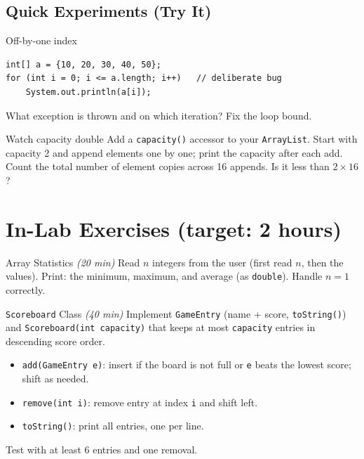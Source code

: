 \documentclass[11pt]{article}
\begin{document}
\subsection*{Quick Experiments (Try It)}

\begin{tryit}{Off-by-one index}
\begin{lstlisting}
int[] a = {10, 20, 30, 40, 50};
for (int i = 0; i <= a.length; i++)   // deliberate bug
    System.out.println(a[i]);
\end{lstlisting}
What exception is thrown and on which iteration? Fix the loop bound.
\end{tryit}

\begin{tryit}{Watch capacity double}
Add a \texttt{capacity()} accessor to your \texttt{ArrayList}.
Start with capacity 2 and append elements one by one; print the capacity after each add.
Count the total number of element copies across 16 appends. Is it less than $2 \times 16$?
\end{tryit}

\section*{In-Lab Exercises (target: 2 hours)}

\begin{labexercise}{Array Statistics \hfill {\small \itshape (20 min)}}
Read $n$ integers from the user (first read $n$, then the values).
Print: the minimum, maximum, and average (as \texttt{double}).
Handle $n = 1$ correctly.
\end{labexercise}

\begin{labexercise}{\texttt{Scoreboard} Class \hfill {\small \itshape (40 min)}}
Implement \texttt{GameEntry} (name + score, \texttt{toString()}) and
\texttt{Scoreboard(int capacity)} that keeps at most \texttt{capacity} entries in descending score order.
\begin{itemize}[leftmargin=*,nosep]
  \item \texttt{add(GameEntry e)}: insert if the board is not full or \texttt{e} beats the lowest score; shift as needed.
  \item \texttt{remove(int i)}: remove entry at index \texttt{i} and shift left.
  \item \texttt{toString()}: print all entries, one per line.
\end{itemize}
Test with at least 6 entries and one removal.
\end{labexercise}
\end{document}
